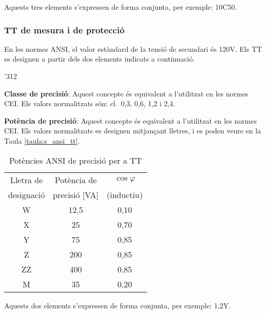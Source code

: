Aquests tres elements s'expressen de forma conjunta, per exemple:
10C50.

\subsubsection{TT de mesura i de protecci\'{o}}

En les normes \textsf{ANSI}, el valor est\`{a}ndard de la tensi\'{o} de
secundari \'{e}s 120\unit{V}. Els TT es designen a partir dels dos
elements indicats a continuaci\'{o}.

\begin{dingautolist}{'312}
    \item \textbf{Classe de precisi\'{o}}: Aquest concepte \'{e}s equivalent
    a l'utilitzat en les normes \textsf{CEI}. Els valors
    normalitzats s\'{o}n: cl.~0,3, 0,6, 1,2 i 2,4.
    \item \textbf{Pot\`{e}ncia de precisi\'{o}}: Aquest concepte \'{e}s equivalent
    a l'utilitzat en les normes \textsf{CEI}. Els valors
    normalitzats es designen mitjan\c{c}ant lletres, i es poden veure en
    la Taula \vref{taula:s_ansi_tt}.

    \begin{table}[h]
    \caption{\label{taula:s_ansi_tt} Pot\`{e}ncies \textsf{ANSI} de precisi\'{o}  per a TT}
    \begin{center}\begin{tabular}{ccc}
    \toprule[1pt]
    Lletra de & Pot\`{e}ncia de & $\cos\varphi$\\
    designaci\'{o} &  precisi\'{o} [VA] &  (inductiu)\\
    \midrule
        W & 12,5 & 0,10\\
        X & 25 & 0,70 \\
        Y & 75 & 0,85 \\
        Z & 200 & 0,85 \\
        ZZ & 400 & 0,85 \\
        M & 35 & 0,20 \\
    \bottomrule[1pt]
    \end{tabular} \end{center}
    \end{table}
\end{dingautolist}

Aquests dos elements s'expressen de forma conjunta, per exemple:
1,2Y.\pagebreak


